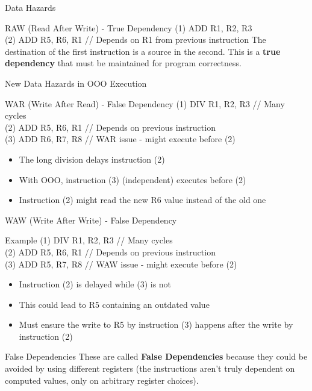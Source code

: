 \documentclass[aspectratio=169,12pt]{beamer}
\begin{document}
\begin{frame}{Data Hazards}
    \begin{block}{RAW (Read After Write) - True Dependency}
        {\ttfamily\footnotesize
        (1) ADD R1, R2, R3\\
        (2) ADD R5, R6, R1  // Depends on R1 from previous instruction
        }
        The destination of the first instruction is a source in the second. This is a \textbf{true dependency} that must be maintained for program correctness.
    \end{block}
\end{frame}

\begin{frame}{New Data Hazards in OOO Execution}
    \begin{block}{WAR (Write After Read) - False Dependency}
        {\ttfamily\footnotesize
        (1) DIV R1, R2, R3  // Many cycles\\
        (2) ADD R5, R6, R1  // Depends on previous instruction\\
        (3) ADD R6, R7, R8  // WAR issue - might execute before (2)
        }
        \begin{itemize}
            \item The long division delays instruction (2)
            \item With OOO, instruction (3) (independent) executes before (2)
            \item Instruction (2) might read the new R6 value instead of the old one
        \end{itemize}
    \end{block}
\end{frame}

\begin{frame}{WAW (Write After Write) - False Dependency}
    \begin{block}{Example}
        {\ttfamily\footnotesize
        (1) DIV R1, R2, R3  // Many cycles\\
        (2) ADD R5, R6, R1  // Depends on previous instruction\\
        (3) ADD R5, R7, R8  // WAW issue - might execute before (2)
        }
    \end{block}
    
    \begin{itemize}
        \item Instruction (2) is delayed while (3) is not
        \item This could lead to R5 containing an outdated value
        \item Must ensure the write to R5 by instruction (3) happens after the write by instruction (2)
    \end{itemize}
    
    \begin{alertblock}{False Dependencies}
        These are called \textbf{False Dependencies} because they could be avoided by using different registers (the instructions aren't truly dependent on computed values, only on arbitrary register choices).
    \end{alertblock}
\end{frame}
\end{document}
